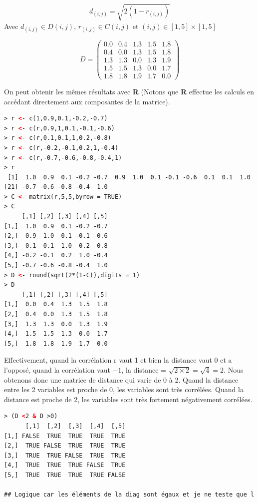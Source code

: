 $$d_{(i,j)} = \sqrt{2(1-r_{(i,j)})}$$
Avec $d_{(i,j)}  \in D(i,j)$, $r_{(i,j)}  \in C(i,j)$ et $(i,j)\in [1,5]\times[1,5]$

$$D = \begin{pmatrix} 
0.0 & 0.4 & 1.3 & 1.5 & 1.8 \\
0.4 & 0.0 & 1.3 & 1.5 & 1.8 \\
1.3 & 1.3 & 0.0 & 1.3 & 1.9 \\
1.5 & 1.5 & 1.3 & 0.0 & 1.7 \\
1.8 & 1.8 & 1.9 & 1.7 & 0.0
\end{pmatrix}$$

On peut obtenir les mêmes résultats avec \textbf{R} (Notons que \textbf{R} effectue les calculs en accédant directement aux composantes de la matrice).
\begin{lstlisting}[language=html]
> r <- c(1,0.9,0.1,-0.2,-0.7)
> r <- c(r,0.9,1,0.1,-0.1,-0.6)
> r <- c(r,0.1,0.1,1,0.2,-0.8)
> r <- c(r,-0.2,-0.1,0.2,1,-0.4)
> r <- c(r,-0.7,-0.6,-0.8,-0.4,1)
> r
 [1]  1.0  0.9  0.1 -0.2 -0.7  0.9  1.0  0.1 -0.1 -0.6  0.1  0.1  1.0  0.2 -0.8 -0.2 -0.1  0.2  1.0 -0.4
[21] -0.7 -0.6 -0.8 -0.4  1.0
> C <- matrix(r,5,5,byrow = TRUE)
> C
     [,1] [,2] [,3] [,4] [,5]
[1,]  1.0  0.9  0.1 -0.2 -0.7
[2,]  0.9  1.0  0.1 -0.1 -0.6
[3,]  0.1  0.1  1.0  0.2 -0.8
[4,] -0.2 -0.1  0.2  1.0 -0.4
[5,] -0.7 -0.6 -0.8 -0.4  1.0
> D <- round(sqrt(2*(1-C)),digits = 1)
> D
     [,1] [,2] [,3] [,4] [,5]
[1,]  0.0  0.4  1.3  1.5  1.8
[2,]  0.4  0.0  1.3  1.5  1.8
[3,]  1.3  1.3  0.0  1.3  1.9
[4,]  1.5  1.5  1.3  0.0  1.7
[5,]  1.8  1.8  1.9  1.7  0.0
\end{lstlisting}
Effectivement, quand la corrélation r vaut 1 et bien la distance vaut 0 et a l'opposé, quand la corrélation vaut $-1$, la distance = $\sqrt{2\times 2} = \sqrt{4} = 2$. Nous obtenons donc une matrice de distance qui varie de 0 à 2. Quand la distance entre les 2 variables est proche de 0, les variables sont très corrélées. Quand la distance est proche de 2, les
variables sont très fortement négativement corrélées.
\begin{lstlisting}[language=html]
> (D <2 & D >0)
      [,1]  [,2]  [,3]  [,4]  [,5]
[1,] FALSE  TRUE  TRUE  TRUE  TRUE
[2,]  TRUE FALSE  TRUE  TRUE  TRUE
[3,]  TRUE  TRUE FALSE  TRUE  TRUE
[4,]  TRUE  TRUE  TRUE FALSE  TRUE
[5,]  TRUE  TRUE  TRUE  TRUE FALSE

## Logique car les éléments de la diag sont égaux et je ne teste que l'inégalité stricte
\end{lstlisting}

